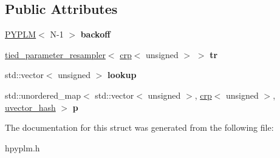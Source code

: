 \subsection*{Public Attributes}
\begin{DoxyCompactItemize}
\item 
\mbox{\label{structcpyp_1_1_p_y_p_l_m_abba5ef2af7b916ca595f3d9694c6a118}} 
\mbox{\hyperlink{structcpyp_1_1_p_y_p_l_m}{P\+Y\+P\+LM}}$<$ N-\/1 $>$ {\bfseries backoff}
\item 
\mbox{\label{structcpyp_1_1_p_y_p_l_m_a8d438a19aadd12a046be958ffd0d5036}} 
\mbox{\hyperlink{structcpyp_1_1tied__parameter__resampler}{tied\+\_\+parameter\+\_\+resampler}}$<$ \mbox{\hyperlink{classcpyp_1_1crp}{crp}}$<$ unsigned $>$ $>$ {\bfseries tr}
\item 
\mbox{\label{structcpyp_1_1_p_y_p_l_m_a94340f4378e89d366c5c4db82d20f565}} 
std\+::vector$<$ unsigned $>$ {\bfseries lookup}
\item 
\mbox{\label{structcpyp_1_1_p_y_p_l_m_aa9b766dc714a43aca4f109c53cacfeb2}} 
std\+::unordered\+\_\+map$<$ std\+::vector$<$ unsigned $>$, \mbox{\hyperlink{classcpyp_1_1crp}{crp}}$<$ unsigned $>$, \mbox{\hyperlink{structuvector__hash}{uvector\+\_\+hash}} $>$ {\bfseries p}
\end{DoxyCompactItemize}


The documentation for this struct was generated from the following file\+:\begin{DoxyCompactItemize}
\item 
hpyplm.\+h\end{DoxyCompactItemize}
